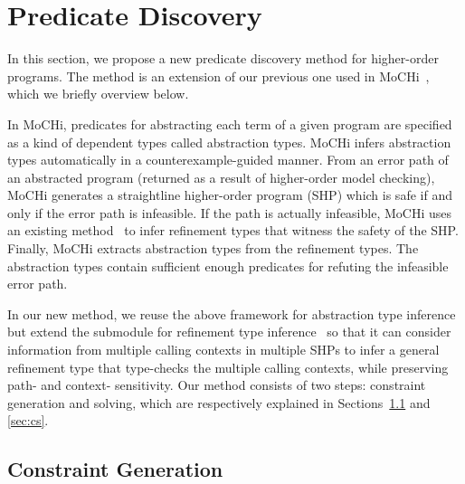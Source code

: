 

\section{Predicate Discovery}

In this section, we propose a new predicate discovery method for 
higher-order programs.  The method is an extension of our previous one 
used in MoCHi~\cite{KobayashiPLDI2011}, which we briefly overview below.

In MoCHi, predicates for abstracting each term of a given program are 
specified as a kind of dependent types called abstraction types.  MoCHi 
infers abstraction types automatically in a counterexample-guided manner. 
 From an error path of an abstracted program (returned as a result of 
higher-order model checking), MoCHi generates a straightline 
higher-order program (SHP) which is safe if and only if the error path 
is infeasible.  If the path is actually infeasible, MoCHi uses an 
existing method~\cite{Unno2009} to infer refinement types that witness 
the safety of the SHP.  Finally, MoCHi extracts abstraction types from 
the refinement types.  The abstraction types contain sufficient enough 
predicates for refuting the infeasible error path.

In our new method, we reuse the above framework for abstraction type 
inference but extend the submodule for refinement type 
inference~\cite{Unno2009} so that it can consider information from 
multiple calling contexts in multiple SHPs to infer a general refinement 
type that type-checks the multiple calling contexts, while preserving 
path- and context- sensitivity.  Our method consists of two steps: 
constraint generation and solving, which are respectively explained in 
Sections~\ref{sec:cg} and \ref{sec:cs}.

\subsection{Constraint Generation}
\label{sec:cg}

